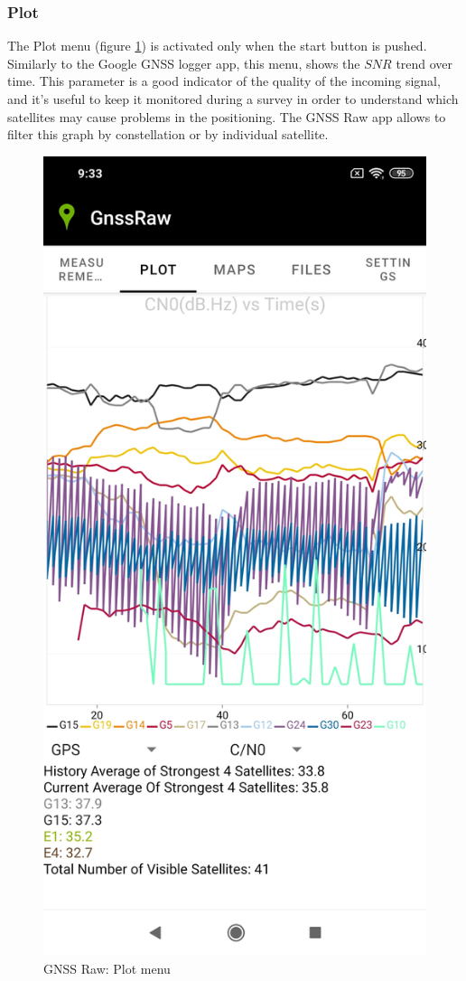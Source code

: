 \subsubsection*{Plot}
The Plot menu (figure \ref{FIG:gnssraw_plot}) is activated only when the start button is pushed. Similarly to the Google GNSS logger app, this menu, shows the $SNR$ trend over time. This parameter is a good indicator of the quality of the incoming signal, and it's useful to keep it monitored during a survey in order to understand which satellites may cause problems in the positioning. The GNSS Raw app allows to filter this graph by constellation or by individual satellite.

\begin{figure}[H] 
	\centering
	\includegraphics[scale=0.15,frame]{fig/gnssraw_plots.jpg} 
	\caption{GNSS Raw: Plot menu}
	\label{FIG:gnssraw_plot} 
\end{figure}

